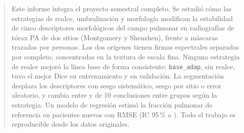 ﻿\begin{abstract}
Este informe integra el proyecto semestral completo. Se estudió cómo las
estrategias de realce, umbralización y morfología modifican la estabilidad de cinco
descriptores morfológicos del campo pulmonar en \FinNImagenes{} radiografías de
tórax PA de dos sitios (Montgomery y Shenzhen), frente a máscaras trazadas por
personas. Los dos orígenes tienen firmas espectrales separadas por completo,
concentradas en la textura de escala fina. Ninguna estrategia de realce mejoró la
línea base de forma consistente; \texttt{base\_adap}, sin realce, tuvo el mejor
Dice en entrenamiento y en validación. La segmentación desplaza los descriptores
con sesgo sistemático, sesgo por sitio o error aleatorio, y cambia entre
\FinDiscMin{} y \FinDiscMax{} de 10 conclusiones entre grupos según la estrategia.
Un modelo de regresión estimó la fracción pulmonar de referencia en pacientes
nuevos con RMSE \FinRMSE{} (IC 95\,\% \FinRMSEInf{} a \FinRMSESup{}). Todo el
trabajo es reproducible desde los datos originales.
\end{abstract}
\newpage
